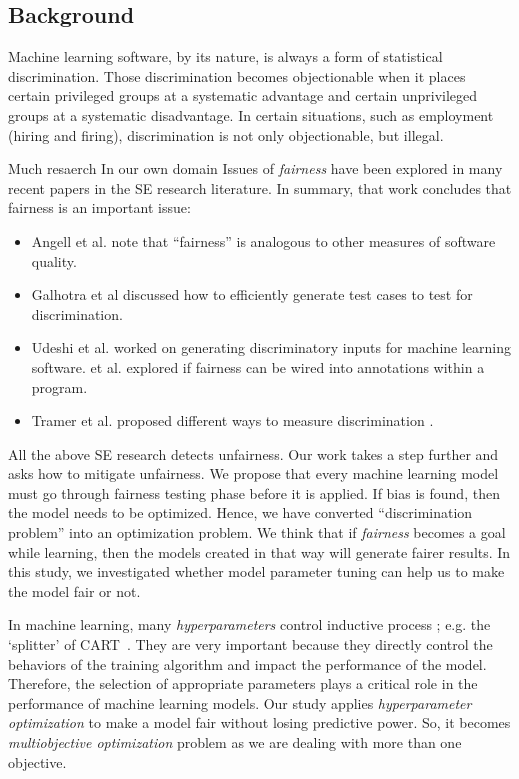 \documentclass{NSF}
\newenvironment{myitemize}
{ \begin{itemize}
    \setlength{\itemsep}{0pt}
    \setlength{\parskip}{0pt}
    \setlength{\parsep}{0pt}     }
{ \end{itemize}                  }
\newcommand{\bi}{\begin{myitemize}}
\newcommand{\ei}{\end{myitemize}}
\begin{document}
\begin{nsfdescription}
 \section{Background}\label{tion:back}

Machine learning software, by its nature, is always a form of statistical discrimination. 
Those discrimination becomes objectionable when it places certain privileged groups at  a systematic advantage and certain unprivileged groups at a systematic disadvantage. In certain situations, such as employment (hiring and firing), discrimination is not only objectionable, but illegal.

Much resaerch In our own domain Issues of \textit{fairness} have been explored in many  recent papers in the SE research literature.
In summary, that work concludes that fairness is an important issue:
\bi
\item Angell et al. \cite{Angell:2018:TAT:3236024.3264590}  note that     ``fairness'' is analogous to other measures of software quality. \item Galhotra et al discussed how to efficiently generate test cases to test for discrimination\cite{Galhotra_2017}. \item Udeshi et al. \cite{Udeshi_2018} worked on generating discriminatory  inputs for machine learning software. \itemAlbarghouthi et al. \cite{Albarghouthi:2019:FP:3287560.3287588} explored if fairness can be wired into annotations within a program.
\item Tramer et al. proposed different ways to measure discrimination \cite{Tramer_2017}.
\ei
All the above SE research detects unfairness. Our work takes a step further and asks how to mitigate
unfairness. We propose that every machine learning model must go through fairness testing phase before it is applied. If bias is found, then the model needs to be optimized. Hence, we have converted ``discrimination problem'' into an optimization problem. We think that if \textit{fairness} becomes a goal while learning, then the  models created in that way will generate fairer results. In this study, we investigated whether model parameter tuning can help us to make the model fair or not. 
 
 In machine learning, many  {\em hyperparameters} control   inductive process ; e.g. the   `splitter' of CART~\cite{breiman2017classification}.  They are very important because they directly control the behaviors of the training algorithm and impact the performance of the model. Therefore, the selection of appropriate parameters plays a critical role in the performance of machine learning models. Our study applies \textit{hyperparameter optimization} to make a model fair without losing predictive power. So, it becomes \textit{multiobjective optimization} problem as we are dealing with more than one objective. 
 


\end{nsfdescription}
\end{document}

